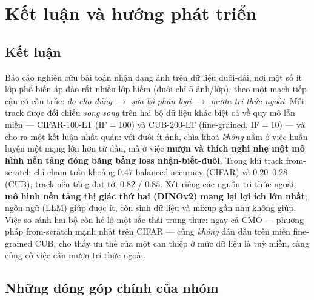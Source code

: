 \chapter{Kết luận và hướng phát triển}
\label{chap:conclusion}

\section{Kết luận}

Báo cáo nghiên cứu bài toán nhận dạng ảnh trên dữ liệu đuôi-dài, nơi một số ít lớp phổ biến áp đảo
rất nhiều lớp hiếm (đuôi chỉ 5 ảnh/lớp), theo một mạch tiếp cận có cấu trúc: \emph{đo cho đúng
$\rightarrow$ sửa bộ phân loại $\rightarrow$ mượn tri thức ngoài}. Mỗi track được đối chiếu \emph{song
song} trên hai bộ dữ liệu khác biệt cả về quy mô lẫn miền --- CIFAR-100-LT (IF$=$100) và CUB-200-LT
(fine-grained, IF$=$10) --- và cho ra một kết luận nhất quán: với đuôi ít ảnh, chìa khoá \emph{không}
nằm ở việc huấn luyện một mạng lớn hơn từ đầu, mà ở việc \textbf{mượn và thích nghi nhẹ một mô hình
nền tảng đóng băng bằng loss nhận-biết-đuôi}. Trong khi track from-scratch chỉ chạm trần khoảng
$0.47$ balanced accuracy (CIFAR) và $0.20$--$0.28$ (CUB), track nền tảng đạt tới $\mathbf{0.82}$ /
$\mathbf{0.85}$. Xét riêng các nguồn tri thức ngoài, \textbf{mô hình nền tảng thị giác thứ hai
(DINOv2) mang lại lợi ích lớn nhất}; ngôn ngữ (LLM) giúp được ít, còn sinh dữ liệu và mixup gần như
không giúp. Việc so sánh hai bộ còn hé lộ một sắc thái trung thực: ngay cả CMO --- phương pháp
from-scratch mạnh nhất trên CIFAR --- cũng \emph{không} dẫn đầu trên miền fine-grained CUB, cho thấy
ưu thế của một can thiệp ở mức dữ liệu là tuỳ miền, càng củng cố việc cần mượn tri thức ngoài.

\section{Những đóng góp chính của nhóm}

